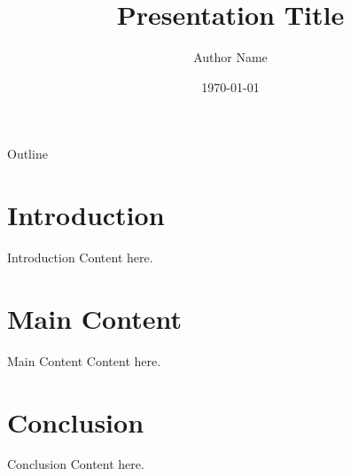 \documentclass{beamer}
\title{Presentation Title}
\author{Author Name}
\institute{Institution}
\date{\today}
\begin{document}
\begin{frame}
  \titlepage
\end{frame}

\begin{frame}{Outline}
  \tableofcontents
\end{frame}

\section{Introduction}
\begin{frame}{Introduction}
  Content here.
\end{frame}

\section{Main Content}
\begin{frame}{Main Content}
  Content here.
\end{frame}

\section{Conclusion}
\begin{frame}{Conclusion}
  Content here.
\end{frame}
\end{document}
